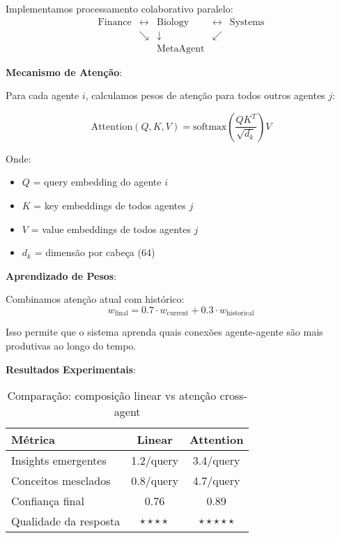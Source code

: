 \documentclass[11pt]{article}
\begin{document}
Implementamos processamento colaborativo paralelo:
\begin{equation}
\begin{matrix}
\text{Finance} & \leftrightarrow & \text{Biology} & \leftrightarrow & \text{Systems} \\
& \searrow & \downarrow & \swarrow & \\
& & \text{MetaAgent} & &
\end{matrix}
\end{equation}

\textbf{Mecanismo de Atenção}:

Para cada agente $i$, calculamos pesos de atenção para todos outros agentes $j$:

\begin{equation}
\text{Attention}(Q, K, V) = \text{softmax}\left(\frac{QK^T}{\sqrt{d_k}}\right)V
\end{equation}

Onde:
\begin{itemize}
    \item $Q$ = query embedding do agente $i$
    \item $K$ = key embeddings de todos agentes $j$
    \item $V$ = value embeddings de todos agentes $j$
    \item $d_k$ = dimensão por cabeça (64)
\end{itemize}

\textbf{Aprendizado de Pesos}:

Combinamos atenção atual com histórico:
\begin{equation}
w_{\text{final}} = 0.7 \cdot w_{\text{current}} + 0.3 \cdot w_{\text{historical}}
\end{equation}

Isso permite que o sistema aprenda quais conexões agente-agente são mais produtivas ao longo do tempo.

\textbf{Resultados Experimentais}:

\begin{table}[H]
\centering
\begin{tabular}{@{}lcc@{}}
\toprule
\textbf{Métrica} & \textbf{Linear} & \textbf{Attention} \\ \midrule
Insights emergentes & 1.2/query & 3.4/query \\
Conceitos mesclados & 0.8/query & 4.7/query \\
Confiança final & 0.76 & 0.89 \\
Qualidade da resposta & $\star\star\star\star$ & $\star\star\star\star\star$ \\
\bottomrule
\end{tabular}
\caption{Comparação: composição linear vs atenção cross-agent}
\end{table}
\end{document}
